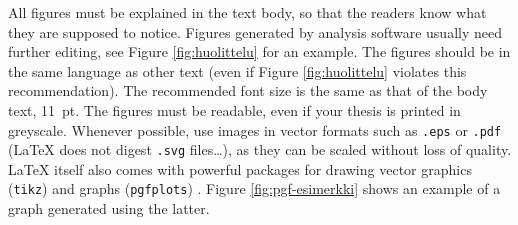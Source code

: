 All figures must be explained in the text body, so that the readers know what they are supposed to notice. Figures generated by analysis software usually need further editing, see Figure \ref{fig:huolittelu} for an example. The figures should be in the same language as other text (even if Figure \ref{fig:huolittelu} violates this recommendation). The recommended font size is the same as that of the body text, \SI{11}{pt}. The figures must be readable, even if your thesis is printed in greyscale. Whenever possible, use images in vector formats such as \texttt{.eps} or \texttt{.pdf} (\LaTeX{} does not digest \texttt{.svg} files\ldots), as they can be scaled without loss of quality. \LaTeX{} itself also comes with powerful packages for drawing vector graphics (\texttt{tikz}) \parencite{tikz} and graphs (\texttt{pgfplots}) \parencite{pgfplots}. Figure \ref{fig:pgf-esimerkki} shows an example of a graph generated using the latter.

